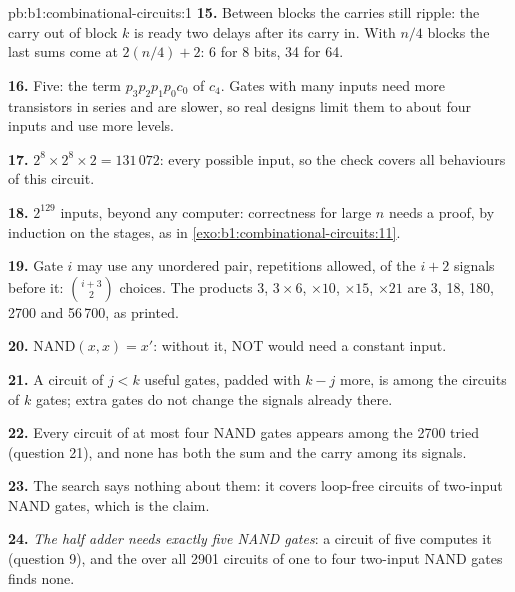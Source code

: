 \begin{solution}{pb:b1:combinational-circuits:1}
\textbf{15.} Between blocks the carries still ripple: the carry out of block $k$ is ready two delays after its carry in.
With $n / 4$ blocks the last sums come at $2(n / 4) + 2$: 6 for 8 bits, 34 for 64.

\textbf{16.} Five: the term $p_3 p_2 p_1 p_0 c_0$ of $c_4$. Gates with many inputs need more transistors in series and are
slower, so real designs limit them to about four inputs and use more levels.

\textbf{17.} $2^8 \times 2^8 \times 2 = 131\,072$: every possible input, so the check covers all behaviours of this
circuit.

\textbf{18.} $2^{129}$ inputs, beyond any computer: correctness for large $n$ needs a proof, by induction on the stages,
as in \cref{exo:b1:combinational-circuits:11}.

\textbf{19.} Gate $i$ may use any unordered pair, repetitions allowed, of the $i + 2$ signals before it:
$\binom{i + 3}{2}$ choices. The products $3$, $3 \times 6$, $\times 10$, $\times 15$, $\times 21$ are 3, 18, 180, 2700 and
56\,700, as printed.

\textbf{20.} $\text{NAND}(x, x) = x'$: without it, NOT would need a constant input.

\textbf{21.} A circuit of $j < k$ useful gates, padded with $k - j$ more, is among the circuits of $k$ gates; extra gates
do not change the signals already there.

\textbf{22.} Every circuit of at most four NAND gates appears among the 2700 tried (question 21), and none has both the
sum and the carry among its signals.

\textbf{23.} The search says nothing about them: it covers loop-free circuits of two-input NAND gates, which is the
claim.

\textbf{24.} \emph{The half adder needs exactly five NAND gates}: a circuit of five computes it (question 9), and the
 over all 2901 circuits of one to four two-input NAND gates finds none.
\end{solution}
